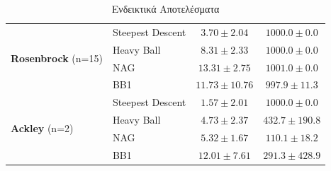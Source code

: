 \documentclass[12pt]{article}
\begin{document}
\begin{table}[H]
{\begin{tabular}{|l|l|c|c|}
        \multirow{4}{*}{\textbf{Rosenbrock} (n=15)} 
        & Steepest Descent & $3.70 \pm 2.04$ & $1000.0 \pm 0.0$ \\
        & Heavy Ball & $8.31 \pm 2.33$ & $1000.0 \pm 0.0$ \\
        & NAG & $13.31 \pm 2.75$ & $1001.0 \pm 0.0$ \\
        & BB1 & $11.73 \pm 10.76$ & $997.9 \pm 11.3$ \\
        \hline
        
        \multirow{4}{*}{\textbf{Ackley} (n=2)} 
        & Steepest Descent & $1.57 \pm 2.01$ & $1000.0 \pm 0.0$ \\
        & Heavy Ball & $4.73 \pm 2.37$ & $432.7 \pm 190.8$ \\
        & NAG & $5.32 \pm 1.67$ & $110.1 \pm 18.2$ \\
        & BB1 & $12.01 \pm 7.61$ & $291.3 \pm 428.9$ \\
        \hline
    \end{tabular}
    }
    \caption{Ενδεικτικά Αποτελέσματα}
    \label{tab:results}
\end{table}

\clearpage



\end{document}
